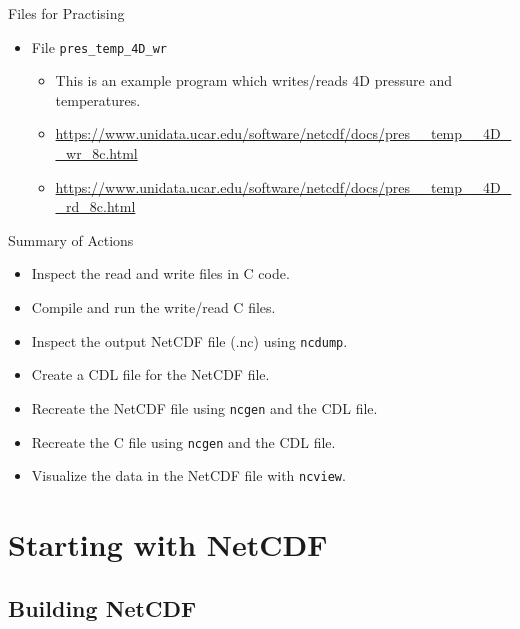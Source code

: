\documentclass[compress,11pt,xcolor=svgnames,aspectratio=169]{beamer}
\begin{document}
\begin{frame}[fragile]{Files for Practising}
\begin{itemize}
  \item {\scriptsize File \verb|pres_temp_4D_wr|}
    \begin{itemize}
      \item {\scriptsize This is an example program which writes/reads 4D pressure and temperatures.}
      \item {\tiny \url{https://www.unidata.ucar.edu/software/netcdf/docs/pres__temp__4D__wr_8c.html}}
      \item {\tiny \url{https://www.unidata.ucar.edu/software/netcdf/docs/pres__temp__4D__rd_8c.html}}
    \end{itemize}

\end{itemize}

\end{frame}

\begin{frame}[fragile]{Summary of Actions}

\begin{itemize}
\setlength\itemsep{0.3cm}

  \item Inspect the read and write files in C code.
  \item Compile and run the write/read C files.
  \item Inspect the output NetCDF file (.nc) using \texttt{ncdump}.
  \item Create a CDL file for the NetCDF file.
  \item Recreate the NetCDF file using \texttt{ncgen} and the CDL file.
  \item Recreate the C file using \texttt{ncgen} and the CDL file.
  \item Visualize the data in the NetCDF file with \texttt{ncview}.

\end{itemize}

\end{frame}

\section{Starting with NetCDF}
\label{netcdf}

\subsection{Building NetCDF}
\end{document}
